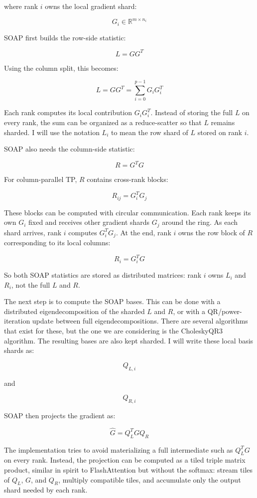 \documentclass[10pt]{article}
\begin{document}
where rank $i$ owns the local gradient shard:

$$
G_i \in \mathbb{R}^{m \times n_i}
$$

SOAP first builds the row-side statistic:

$$
L = GG^T
$$

Using the column split, this becomes:

$$
L = GG^T = \sum_{i=0}^{p-1} G_iG_i^T
$$

Each rank computes its local contribution $G_iG_i^T$. Instead of storing the full $L$ on every rank, the sum can be organized as a reduce-scatter so that $L$ remains sharded. I will use the notation $L_i$ to mean the row shard of $L$ stored on rank $i$.

SOAP also needs the column-side statistic:

$$
R = G^TG
$$

For column-parallel TP, $R$ contains cross-rank blocks:

$$
R_{ij} = G_i^TG_j
$$

These blocks can be computed with circular communication. Each rank keeps its own $G_i$ fixed and receives other gradient shards $G_j$ around the ring. As each shard arrives, rank $i$ computes $G_i^TG_j$. At the end, rank $i$ owns the row block of $R$ corresponding to its local columns:

$$
R_i = G_i^TG
$$

So both SOAP statistics are stored as distributed matrices: rank $i$ owns $L_i$ and $R_i$, not the full $L$ and $R$.

The next step is to compute the SOAP bases. This can be done with a distributed eigendecomposition of the sharded $L$ and $R$, or with a QR/power-iteration update between full eigendecompositions. There are several algorithms that exist for these, but the one we are considering is the CholeskyQR3 algorithm. The resulting bases are also kept sharded. I will write these local basis shards as:

$$
Q_{L,i}
$$

and

$$
Q_{R,i}
$$

SOAP then projects the gradient as:

$$
\widehat{G} = Q_L^T G Q_R
$$

The implementation tries to avoid materializing a full intermediate such as $Q_L^TG$ on every rank. Instead, the projection can be computed as a tiled triple matrix product, similar in spirit to FlashAttention but without the softmax: stream tiles of $Q_L$, $G$, and $Q_R$, multiply compatible tiles, and accumulate only the output shard needed by each rank.
\end{document}
